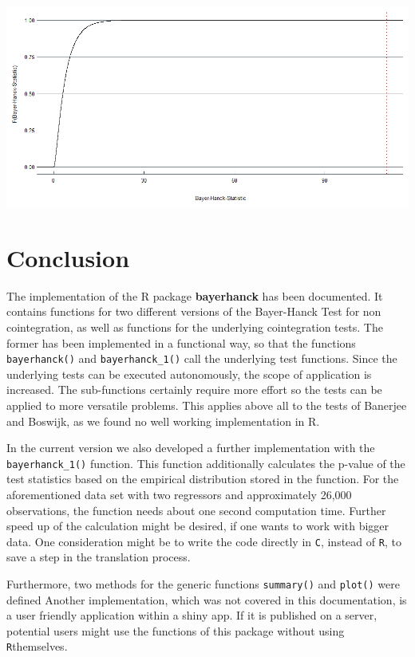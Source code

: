 \documentclass[12pt,a4paper]{article}
\let\origfigure\figure
\let\endorigfigure\endfigure
\renewenvironment{figure}[1][2] {
    \expandafter\origfigure\expandafter[H]
} {
    \endorigfigure
}
\begin{document}
\begin{figure}
\centering
\includegraphics{plot_bh.png}
\caption{Cumulative Distribution Function under \(\mathcal{H}_0\)}
\end{figure}

\hypertarget{conclusion}{%
\section{Conclusion}\label{conclusion}}

The implementation of the R package \textbf{bayerhanck} has been
documented. It contains functions for two different versions of the
Bayer-Hanck Test for non cointegration, as well as functions for the
underlying cointegration tests. The former has been implemented in a
functional way, so that the functions \texttt{bayerhanck()} and
\texttt{bayerhanck\_1()} call the underlying test functions. Since the
underlying tests can be executed autonomously, the scope of application
is increased. The sub-functions certainly require more effort so the
tests can be applied to more versatile problems. This applies above all
to the tests of Banerjee and Boswijk, as we found no well working
implementation in R.

In the current version we also developed a further implementation with
the \texttt{bayerhanck\_1()} function. This function additionally
calculates the p-value of the test statistics based on the empirical
distribution stored in the function. For the aforementioned data set
with two regressors and approximately 26,000 observations, the function
needs about one second computation time. Further speed up of the
calculation might be desired, if one wants to work with bigger data. One
consideration might be to write the code directly in \texttt{C}, instead
of \texttt{R}, to save a step in the translation process.

Furthermore, two methods for the generic functions \texttt{summary()}
and \texttt{plot()} were defined Another implementation, which was not
covered in this documentation, is a user friendly application within a
shiny app. If it is published on a server, potential users might use the
functions of this package without using \texttt{R}themselves.
\end{document}
